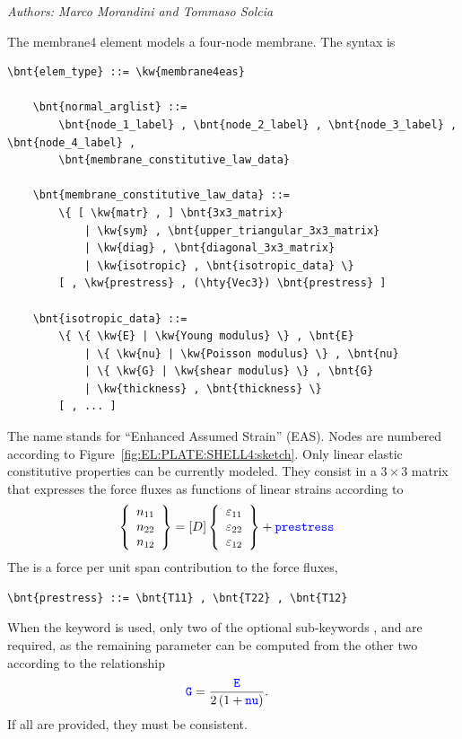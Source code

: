 \emph{Authors: Marco Morandini and Tommaso Solcia}

The membrane4 element models a four-node membrane.
The syntax is
\begin{Verbatim}[commandchars=\\\{\}]
    \bnt{elem_type} ::= \kw{membrane4eas} 

    \bnt{normal_arglist} ::=
        \bnt{node_1_label} , \bnt{node_2_label} , \bnt{node_3_label} , \bnt{node_4_label} ,
        \bnt{membrane_constitutive_law_data}

    \bnt{membrane_constitutive_law_data} ::=
        \{ [ \kw{matr} , ] \bnt{3x3_matrix}
            | \kw{sym} , \bnt{upper_triangular_3x3_matrix}
            | \kw{diag} , \bnt{diagonal_3x3_matrix}
            | \kw{isotropic} , \bnt{isotropic_data} \}
        [ , \kw{prestress} , (\hty{Vec3}) \bnt{prestress} ]

    \bnt{isotropic_data} ::=
        \{ \{ \kw{E} | \kw{Young modulus} \} , \bnt{E}
            | \{ \kw{nu} | \kw{Poisson modulus} \} , \bnt{nu}
            | \{ \kw{G} | \kw{shear modulus} \} , \bnt{G}
            | \kw{thickness} , \bnt{thickness} \}
        [ , ... ]
\end{Verbatim}
The name  stands for ``Enhanced Assumed Strain'' (EAS).
Nodes are numbered according to Figure~\ref{fig:EL:PLATE:SHELL4:sketch}.
Only linear elastic constitutive properties can be currently modeled.
They consist in a $3 \times 3$ matrix that expresses the force
fluxes as functions of linear strains according to
\begin{align}
	\left\{ \begin{array}{c} 
		n_{11} \\
		n_{22} \\
		n_{12}
	 \end{array} \right\}
	&=
	\left[ D \right]
	\left\{ \begin{array}{c} 
		\varepsilon_{11} \\
		\varepsilon_{22} \\
		\varepsilon_{12}
	 \end{array} \right\}
	+
	\textcolor{blue}{\texttt{prestress}}
\end{align}
The  is a force per unit span contribution
to the force fluxes,
\begin{Verbatim}[commandchars=\\\{\}]
    \bnt{prestress} ::= \bnt{T11} , \bnt{T22} , \bnt{T12}
\end{Verbatim}

When the  keyword is used, only two of the optional
sub-keywords ,  and  are required, as the remaining
parameter can be computed from the other two according to the relationship
\begin{align}
	\textcolor{blue}{\texttt{G}}
	&=
	\frac{\textcolor{blue}{\texttt{E}}}{2\left( 1 + \textcolor{blue}{\texttt{nu}} \right)}
	.
\end{align}
If all are provided, they must be consistent.


